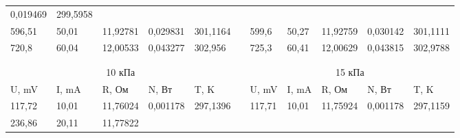 \documentclass[12pt,a4paper]{article}
\begin{document}
\begin{enumerate}
{\begin{table}[p]
{\begin{tabular}{lllllllllll}
							\multicolumn{1}{l|}{0,019469} &
							\multicolumn{1}{l|}{299,5958} \\ \cline{1-5} \cline{7-11} 
							\multicolumn{1}{|l|}{596,51} &
							\multicolumn{1}{l|}{50,01} &
							\multicolumn{1}{l|}{11,92781} &
							\multicolumn{1}{l|}{0,029831} &
							\multicolumn{1}{l|}{301,1164} &
							\multicolumn{1}{l|}{} &
							\multicolumn{1}{l|}{599,6} &
							\multicolumn{1}{l|}{50,27} &
							\multicolumn{1}{l|}{11,92759} &
							\multicolumn{1}{l|}{0,030142} &
							\multicolumn{1}{l|}{301,1111} \\ \cline{1-5} \cline{7-11} 
							\multicolumn{1}{|l|}{720,8} &
							\multicolumn{1}{l|}{60,04} &
							\multicolumn{1}{l|}{12,00533} &
							\multicolumn{1}{l|}{0,043277} &
							\multicolumn{1}{l|}{302,956} &
							\multicolumn{1}{l|}{} &
							\multicolumn{1}{l|}{725,3} &
							\multicolumn{1}{l|}{60,41} &
							\multicolumn{1}{l|}{12,00629} &
							\multicolumn{1}{l|}{0,043815} &
							\multicolumn{1}{l|}{302,9788} \\ \cline{1-5} \cline{7-11} 
							&
							&
							&
							&
							&
							&
							&
							&
							&
							&
							\\
							&
							&
							&
							&
							&
							&
							&
							&
							&
							&
							\\ \cline{1-5} \cline{7-11} 
							\multicolumn{5}{|c|}{10 кПа} &
							\multicolumn{1}{l|}{} &
							\multicolumn{5}{c|}{15 кПа} \\ \cline{1-5} \cline{7-11} 
							\multicolumn{1}{|l|}{U, mV} &
							\multicolumn{1}{l|}{I, mA} &
							\multicolumn{1}{l|}{R, Ом} &
							\multicolumn{1}{l|}{N, Вт} &
							\multicolumn{1}{l|}{T, K} &
							\multicolumn{1}{l|}{} &
							\multicolumn{1}{l|}{U, mV} &
							\multicolumn{1}{l|}{I, mA} &
							\multicolumn{1}{l|}{R, Ом} &
							\multicolumn{1}{l|}{N, Вт} &
							\multicolumn{1}{l|}{T, K} \\ \cline{1-5} \cline{7-11} 
							\multicolumn{1}{|l|}{117,72} &
							\multicolumn{1}{l|}{10,01} &
							\multicolumn{1}{l|}{11,76024} &
							\multicolumn{1}{l|}{0,001178} &
							\multicolumn{1}{l|}{297,1396} &
							\multicolumn{1}{l|}{} &
							\multicolumn{1}{l|}{117,71} &
							\multicolumn{1}{l|}{10,01} &
							\multicolumn{1}{l|}{11,75924} &
							\multicolumn{1}{l|}{0,001178} &
							\multicolumn{1}{l|}{297,1159} \\ \cline{1-5} \cline{7-11} 
							\multicolumn{1}{|l|}{236,86} &
							\multicolumn{1}{l|}{20,11} &
							\multicolumn{1}{l|}{11,77822} &

\end{tabular}}
\end{table}}
\end{enumerate}
\end{document}
